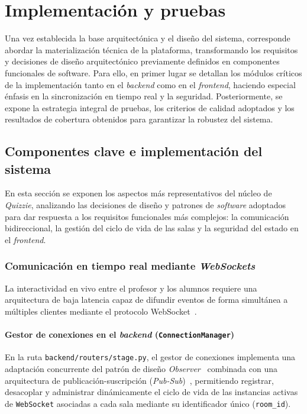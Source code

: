 \chapter{Implementación y pruebas}\label{cap:implementacion_y_pruebas}

Una vez establecida la base arquitectónica y el diseño del sistema, corresponde abordar la materialización técnica de la plataforma, transformando los requisitos y decisiones de diseño arquitectónico previamente definidos en componentes funcionales de software. Para ello, en primer lugar se detallan los módulos críticos de la implementación tanto en el \textit{backend} como en el \textit{frontend}, haciendo especial énfasis en la sincronización en tiempo real y la seguridad. Posteriormente, se expone la estrategia integral de pruebas, los criterios de calidad adoptados y los resultados de cobertura obtenidos para garantizar la robustez del sistema.

\section{Componentes clave e implementación del sistema}\label{sec:componentes_clave}

En esta sección se exponen los aspectos más representativos del núcleo de \textit{Quizzie}, analizando las decisiones de diseño y patrones de \textit{software} adoptados para dar respuesta a los requisitos funcionales más complejos: la comunicación bidireccional, la gestión del ciclo de vida de las salas y la seguridad del estado en el \textit{frontend}.

\subsection{Comunicación en tiempo real mediante \textit{WebSockets}}\label{subsec:impl_websockets}

La interactividad en vivo entre el profesor y los alumnos requiere una arquitectura de baja latencia capaz de difundir eventos de forma simultánea a múltiples clientes mediante el protocolo WebSocket~\cite{websocket_protocol}.

\subsubsection{Gestor de conexiones en el \textit{backend} (\texttt{ConnectionManager})}

En la ruta \texttt{backend/routers/stage.py}, el gestor de conexiones implementa una adaptación concurrente del patrón de diseño \textit{Observer}~\cite{gamma1994design} combinada con una arquitectura de publicación-suscripción (\textit{Pub-Sub})~\cite{eugster2003pubsub}, permitiendo registrar, desacoplar y administrar dinámicamente el ciclo de vida de las instancias activas de \texttt{WebSocket} asociadas a cada sala mediante su identificador único (\texttt{room\_id}).

